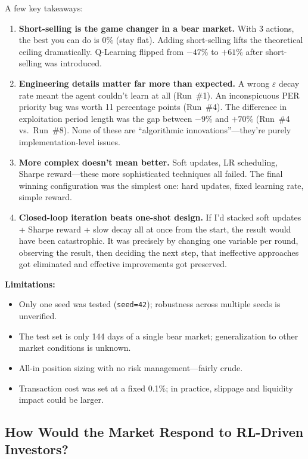 \documentclass[11pt,a4paper]{article}
\begin{document}
A few key takeaways:

\begin{enumerate}
    \item \textbf{Short-selling is the game changer in a bear market.} With 3 actions, the best you can do is 0\% (stay flat). Adding short-selling lifts the theoretical ceiling dramatically. Q-Learning flipped from $-47\%$ to $+61\%$ after short-selling was introduced.

    \item \textbf{Engineering details matter far more than expected.} A wrong $\varepsilon$ decay rate meant the agent couldn't learn at all (Run~\#1). An inconspicuous PER priority bug was worth 11 percentage points (Run~\#4). The difference in exploitation period length was the gap between $-9\%$ and $+70\%$ (Run~\#4 vs.\ Run~\#8). None of these are ``algorithmic innovations''---they're purely implementation-level issues.

    \item \textbf{More complex doesn't mean better.} Soft updates, LR scheduling, Sharpe reward---these more sophisticated techniques all failed. The final winning configuration was the simplest one: hard updates, fixed learning rate, simple reward.

    \item \textbf{Closed-loop iteration beats one-shot design.} If I'd stacked soft updates + Sharpe reward + slow decay all at once from the start, the result would have been catastrophic. It was precisely by changing one variable per round, observing the result, then deciding the next step, that ineffective approaches got eliminated and effective improvements got preserved.
\end{enumerate}

\textbf{Limitations:}
\begin{itemize}[nosep]
    \item Only one seed was tested (\texttt{seed=42}); robustness across multiple seeds is unverified.
    \item The test set is only 144 days of a single bear market; generalization to other market conditions is unknown.
    \item All-in position sizing with no risk management---fairly crude.
    \item Transaction cost was set at a fixed 0.1\%; in practice, slippage and liquidity impact could be larger.
\end{itemize}

\subsection{How Would the Market Respond to RL-Driven Investors?}
\end{document}
